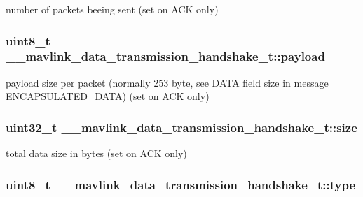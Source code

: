 number of packets beeing sent (set on A\+C\+K only) 

\hypertarget{struct____mavlink__data__transmission__handshake__t_aad2f91bab9dd0218b7077b3f26c58de8}{
\subsubsection[{payload}]{\setlength{\rightskip}{0pt plus 5cm}uint8\+\_\+t \+\_\+\+\_\+mavlink\+\_\+data\+\_\+transmission\+\_\+handshake\+\_\+t\+::payload}}\label{struct____mavlink__data__transmission__handshake__t_aad2f91bab9dd0218b7077b3f26c58de8}


payload size per packet (normally 253 byte, see D\+A\+T\+A field size in message E\+N\+C\+A\+P\+S\+U\+L\+A\+T\+E\+D\+\_\+\+D\+A\+T\+A) (set on A\+C\+K only) 

\hypertarget{struct____mavlink__data__transmission__handshake__t_a56ed0b75c46c954e34311d97b5ade566}{
\subsubsection[{size}]{\setlength{\rightskip}{0pt plus 5cm}uint32\+\_\+t \+\_\+\+\_\+mavlink\+\_\+data\+\_\+transmission\+\_\+handshake\+\_\+t\+::size}}\label{struct____mavlink__data__transmission__handshake__t_a56ed0b75c46c954e34311d97b5ade566}


total data size in bytes (set on A\+C\+K only) 

\hypertarget{struct____mavlink__data__transmission__handshake__t_aa9f6130e6e6de5cc36cf929f34eb9efa}{
\subsubsection[{type}]{\setlength{\rightskip}{0pt plus 5cm}uint8\+\_\+t \+\_\+\+\_\+mavlink\+\_\+data\+\_\+transmission\+\_\+handshake\+\_\+t\+::type}}\label{struct____mavlink__data__transmission__handshake__t_aa9f6130e6e6de5cc36cf929f34eb9efa}


